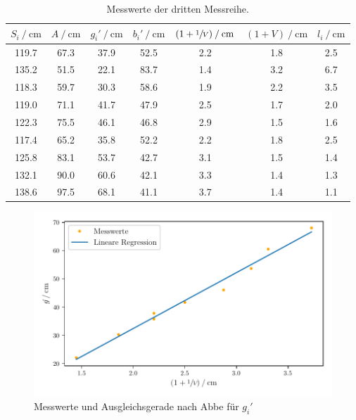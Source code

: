 \begin{table}
    \centering
    \caption{Messwerte der dritten Messreihe.}
    \begin{tabular}{c c c c c c c}
        \toprule
        {$S_i \:/\: \si{\centi\meter}$} & {$A \:/\: \si{\centi\meter}$} & {$g_i' \:/\: \si{\centi\meter}$} & {$b_i' \:/\: \si{\centi\meter}$} 
        & {$(1+\sfrac{1}{V}) \:/\: \si{\centi\meter}$} & {$(1+V) \:/\: \si{\centi\meter}$} & {$l_i \:/\: \si{\centi\meter}$}\\
        \midrule
        119.7 &  67.3 & 37.9 &	52.5 &	2.2 & 1.8 & 2.5 \\
        135.2 &  51.5 & 22.1 &	83.7 &	1.4 & 3.2 & 6.7 \\
        118.3 &  59.7 & 30.3 &	58.6 &	1.9 & 2.2 & 3.5 \\
        119.0 &  71.1 & 41.7 &	47.9 &	2.5 & 1.7 & 2.0 \\
        122.3 &  75.5 & 46.1 &	46.8 &	2.9 & 1.5 & 1.6 \\
        117.4 &  65.2 & 35.8 &	52.2 &	2.2 & 1.8 & 2.5 \\
        125.8 &  83.1 & 53.7 &	42.7 &	3.1 & 1.5 & 1.4 \\
        132.1 &  90.0 & 60.6 &	42.1 &	3.3 & 1.4 & 1.3 \\
        138.6 &  97.5 & 68.1 &	41.1 &	3.7 & 1.4 & 1.1 \\
    \end{tabular}
    \label{tab:mess3}
\end{table}

\begin{figure}
    \centering
    \includegraphics[width=.9\textwidth]{python/plotAbbe1.pdf}
    \caption{Messwerte und Ausgleichsgerade nach Abbe für $g_i'$}
    \label{fig:lin1}
\end{figure}


